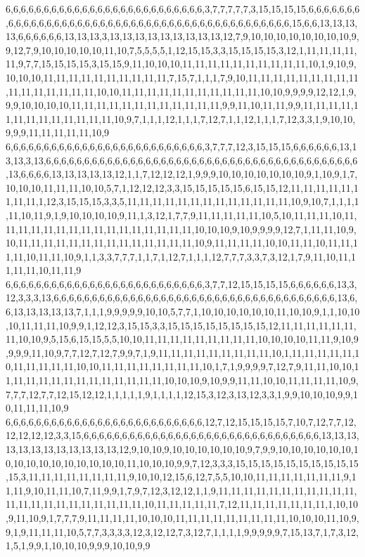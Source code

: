 6,6,6,6,6,6,6,6,6,6,6,6,6,6,6,6,6,6,6,6,6,6,6,6,6,6,3,7,7,7,7,7,3,15,15,15,15,6,6,6,6,6,6,6,6,6,6,6,6,6,6,6,6,6,6,6,6,6,6,6,6,6,6,6,6,6,6,6,6,6,6,6,6,6,6,6,6,6,6,6,6,15,6,6,13,13,13,13,6,6,6,6,6,6,13,13,13,3,13,13,13,13,13,13,13,13,13,12,7,9,10,10,10,10,10,10,10,10,9,9,12,7,9,10,10,10,10,10,11,10,7,5,5,5,5,1,12,15,15,3,3,15,15,15,15,3,12,1,11,11,11,11,11,9,7,7,15,15,15,15,3,15,15,9,11,10,10,10,11,11,11,11,11,11,11,11,11,11,10,1,9,10,9,10,10,10,11,11,11,11,11,11,11,11,11,11,7,15,7,1,1,1,7,9,10,11,11,11,11,11,11,11,11,11,11,11,11,11,11,11,11,10,10,11,11,11,11,11,11,11,11,11,11,11,10,10,9,9,9,9,12,12,1,9,9,9,10,10,10,10,11,11,11,11,11,11,11,11,11,11,11,11,9,9,11,10,11,11,9,9,11,11,11,11,11,11,11,11,11,11,11,11,11,10,9,7,1,1,1,12,1,1,1,7,12,7,1,1,12,1,1,1,7,12,3,3,1,9,10,10,9,9,9,11,11,11,11,11,10,9
6,6,6,6,6,6,6,6,6,6,6,6,6,6,6,6,6,6,6,6,6,6,6,6,6,6,3,7,7,7,12,3,15,15,15,6,6,6,6,6,6,13,13,13,3,13,6,6,6,6,6,6,6,6,6,6,6,6,6,6,6,6,6,6,6,6,6,6,6,6,6,6,6,6,6,6,6,6,6,6,6,6,6,6,6,6,6,13,6,6,6,6,13,13,13,13,13,12,1,1,7,12,12,12,1,9,9,9,10,10,10,10,10,10,10,9,1,10,9,1,7,10,10,10,11,11,11,10,10,5,7,1,12,12,12,3,3,15,15,15,15,15,6,15,15,12,11,11,11,11,11,11,11,11,1,12,3,15,15,15,3,3,5,11,11,11,11,11,11,11,11,11,11,11,11,11,10,9,10,7,1,1,1,1,11,10,11,9,1,9,10,10,10,10,9,11,1,3,12,1,7,7,9,11,11,11,11,11,10,5,10,11,11,11,10,11,11,11,11,11,11,11,11,11,11,11,11,11,11,11,11,10,10,10,9,10,9,9,9,9,12,7,1,11,11,10,9,10,11,11,11,11,11,11,11,11,11,11,11,11,11,11,10,9,11,11,11,11,10,10,11,11,10,11,11,11,11,10,11,11,10,9,1,1,3,3,7,7,7,1,1,7,1,12,7,1,1,1,12,7,7,7,3,3,7,3,12,1,7,9,11,10,11,11,11,11,10,11,11,9
6,6,6,6,6,6,6,6,6,6,6,6,6,6,6,6,6,6,6,6,6,6,6,6,6,6,3,7,7,12,15,15,15,15,6,6,6,6,6,6,13,3,12,3,3,3,13,6,6,6,6,6,6,6,6,6,6,6,6,6,6,6,6,6,6,6,6,6,6,6,6,6,6,6,6,6,6,6,6,6,6,6,6,6,13,6,6,13,13,13,13,13,7,1,1,1,9,9,9,9,9,10,10,5,7,7,1,10,10,10,10,10,10,11,10,10,9,1,1,10,10,10,11,11,11,10,9,9,1,12,12,3,15,15,3,3,15,15,15,15,15,15,15,15,12,11,11,11,11,11,11,11,10,10,9,5,15,6,15,15,5,5,10,10,11,11,11,11,11,11,11,11,11,10,10,10,10,11,11,9,10,9,9,9,9,11,10,9,7,7,12,7,12,7,9,9,7,1,9,11,11,11,11,11,11,11,11,11,10,1,11,11,11,11,11,10,11,11,11,11,11,10,10,11,11,11,11,11,11,11,11,10,1,7,1,9,9,9,9,7,12,7,9,11,11,10,10,11,11,11,11,11,11,11,11,11,11,11,11,11,10,10,10,9,10,9,9,11,11,10,10,11,11,11,11,10,9,7,7,7,12,7,7,12,15,12,12,1,1,1,1,1,9,1,1,1,1,12,15,3,12,3,13,12,3,3,1,9,9,10,10,10,9,9,10,11,11,11,10,9
6,6,6,6,6,6,6,6,6,6,6,6,6,6,6,6,6,6,6,6,6,6,6,6,6,6,12,7,12,15,15,15,15,7,10,7,12,7,7,12,12,12,12,12,3,3,15,6,6,6,6,6,6,6,6,6,6,6,6,6,6,6,6,6,6,6,6,6,6,6,6,6,6,6,6,6,6,6,13,13,13,13,13,13,13,13,13,13,13,13,12,9,10,10,9,10,10,10,10,10,10,9,7,9,9,10,10,10,10,10,10,10,10,10,10,10,10,10,10,10,10,11,10,10,10,9,9,7,12,3,3,3,15,15,15,15,15,15,15,15,15,15,15,3,11,11,11,11,11,11,11,11,9,10,10,12,15,6,12,7,5,5,10,10,11,11,11,11,11,11,11,9,11,11,9,10,11,11,10,7,11,9,9,1,7,9,7,12,3,12,12,1,1,9,11,11,11,11,11,11,11,11,11,11,11,11,11,11,11,11,11,11,11,11,11,11,10,11,11,11,11,11,7,12,11,11,11,11,11,11,11,1,10,10,9,11,10,9,1,7,7,7,9,11,11,11,11,10,10,10,11,11,11,11,11,11,11,11,11,10,10,10,11,10,9,9,1,9,11,11,11,10,5,7,7,3,3,3,3,12,3,12,12,7,3,12,7,1,1,1,1,9,9,9,9,9,7,15,13,7,1,7,3,12,1,5,1,9,9,1,10,10,10,9,9,9,10,10,9,9
